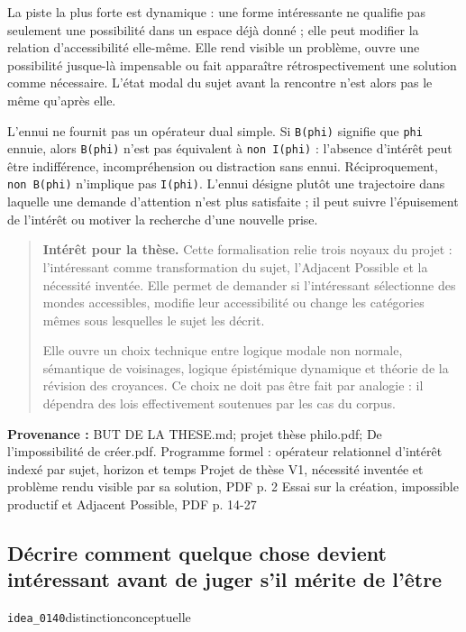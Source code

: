 \documentclass[10pt,a4paper]{article}
\begin{document}
La piste la plus forte est dynamique : une forme intéressante ne qualifie pas seulement une possibilité dans un espace déjà donné ; elle peut modifier la relation d'accessibilité elle-même. Elle rend visible un problème, ouvre une possibilité jusque-là impensable ou fait apparaître rétrospectivement une solution comme nécessaire. L'état modal du sujet avant la rencontre n'est alors pas le même qu'après elle.

L'ennui ne fournit pas un opérateur dual simple. Si \texttt{B(phi)} signifie que \texttt{phi} ennuie, alors \texttt{B(phi)} n'est pas équivalent à \texttt{non I(phi)} : l'absence d'intérêt peut être indifférence, incompréhension ou distraction sans ennui. Réciproquement, \texttt{non B(phi)} n'implique pas \texttt{I(phi)}. L'ennui désigne plutôt une trajectoire dans laquelle une demande d'attention n'est plus satisfaite ; il peut suivre l'épuisement de l'intérêt ou motiver la recherche d'une nouvelle prise.

\begin{quote}
\textbf{Intérêt pour la thèse.} Cette formalisation relie trois noyaux du projet : l'intéressant comme transformation du sujet, l'Adjacent Possible et la nécessité inventée. Elle permet de demander si l'intéressant sélectionne des mondes accessibles, modifie leur accessibilité ou change les catégories mêmes sous lesquelles le sujet les décrit.

Elle ouvre un choix technique entre logique modale non normale, sémantique de voisinages, logique épistémique dynamique et théorie de la révision des croyances. Ce choix ne doit pas être fait par analogie : il dépendra des lois effectivement soutenues par les cas du corpus.
\end{quote}
{\footnotesize\color{metadata}\textbf{Provenance :} BUT DE LA THESE.md; projet thèse philo.pdf; De l'impossibilité de créer.pdf. Programme formel : opérateur relationnel d'intérêt indexé par sujet, horizon et temps Projet de thèse V1, nécessité inventée et problème rendu visible par sa solution, PDF p. 2 Essai sur la création, impossible productif et Adjacent Possible, PDF p. 14-27\par}

\subsection{Décrire comment quelque chose devient intéressant avant de juger s'il mérite de l'être}
{\small\color{metadata} \texttt{idea\_0140}\quad\textbullet\quad distinction\quad\textbullet\quad conceptuelle\par}
\end{document}
